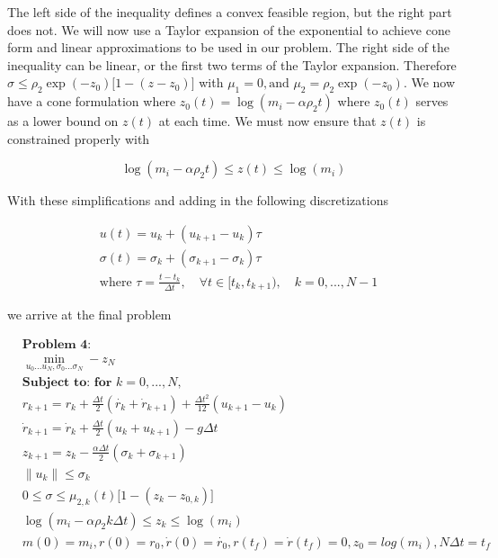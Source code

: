 \documentclass[conf]{new-aiaa}
\begin{document}
\begin{doublespace}
The left side of the inequality defines a convex feasible region, but the right part does not. We will now use a Taylor expansion of the exponential to achieve cone form and linear approximations to be used in our problem. The right side of the inequality can be linear, or the first two terms of the Taylor expansion. Therefore
$\sigma \leq \rho_2 \exp(-z_0) \big[ 1-(z-z_0)\big]$ with $\mu_1 = 0, \text{and } \mu_2 = \rho_2 \exp(-z_0)$. We now have a cone formulation where $z_0(t) = \log(m_i-\alpha\rho_2t)$ where $z_0(t)$ serves as a lower bound on $z(t)$ at each time. We must now ensure that $z(t)$ is constrained properly with

\begin{singlespace}
\begin{equation*}
\log(m_i-\alpha\rho_2t) \leq z(t) \leq \log(m_i) 
\end{equation*}
\end{singlespace}

With these simplifications and adding in the following discretizations 
\begin{singlespace}
\begin{align*}
&u(t) = u_k + (u_{k+1} - u_k)\tau \\
&\sigma(t) = \sigma_k + (\sigma_{k+1} - \sigma_k)\tau \\
&\text{where } \tau = \frac{t - t_k}{ \Delta t}, \quad \forall t \in [t_k,t_{k+1}), \quad k = 0,...,N-1
\end{align*}

we arrive at the final problem

\begin{align*}
& \textbf{Problem 4:} \\
& \min_{u_0 ... u_N, \sigma_0 ... \sigma_N} -z_N \\
& \textbf{Subject to: for } k = 0,...,N,\\
& r_{k+1} = r_k + \frac{\Delta t}{2}(\dot{r_k} + \dot{r}_{k+1}) + \frac{\Delta t^2}{12}(u_{k+1}-u_k) \\
& \dot{r}_{k+1} = \dot{r}_k + \frac{\Delta t}{2}(u_k + u_{k+1}) - g\Delta t \\
& z_{k+1} = z_k - \frac{\alpha \Delta t}{2}(\sigma_k + \sigma_{k+1}) \\
& \|u_k\| \leq \sigma_k \\ 
& 0 \leq \sigma \leq \mu_{2,k}(t)\big[ 1-(z_k-z_{0,k})\big] \\
& \log(m_{i}-\alpha\rho_2k\Delta t) \leq z_k \leq \log(m_{i}) \\
& m(0) = m_{i}, r(0) = r_0, \dot{r}(0) = \dot{r_0}, r(t_f) =\dot{r}(t_f) = 0, z_0 = log(m_{i}), N\Delta t = t_f
\end{align*}
\end{singlespace}


\end{doublespace}
\end{document}
